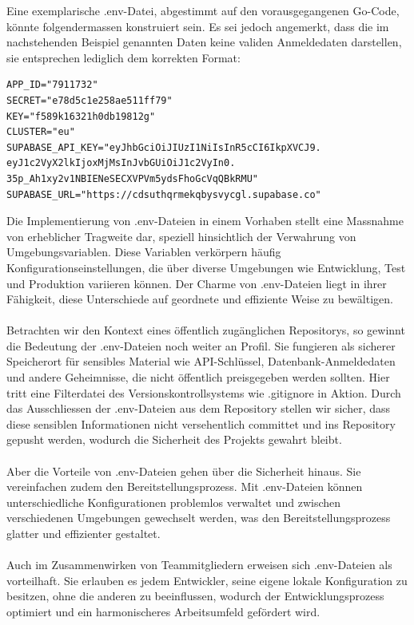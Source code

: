 Eine exemplarische .env-Datei, abgestimmt auf den vorausgegangenen Go-Code, könnte folgendermassen konstruiert sein. Es sei jedoch angemerkt, dass die im nachstehenden Beispiel genannten Daten keine validen Anmeldedaten darstellen, sie entsprechen lediglich dem korrekten Format:
\begin{lstlisting}
APP_ID="7911732"
SECRET="e78d5c1e258ae511ff79"
KEY="f589k16321h0db19812g"
CLUSTER="eu"
SUPABASE_API_KEY="eyJhbGciOiJIUzI1NiIsInR5cCI6IkpXVCJ9.
eyJ1c2VyX2lkIjoxMjMsInJvbGUiOiJ1c2VyIn0.
35p_Ah1xy2v1NBIENeSECXVPVm5ydsFhoGcVqQBkRMU"
SUPABASE_URL="https://cdsuthqrmekqbysvycgl.supabase.co"
\end{lstlisting}
Die Implementierung von .env-Dateien in einem Vorhaben stellt eine Massnahme von erheblicher Tragweite dar, speziell hinsichtlich der Verwahrung von Umgebungsvariablen. Diese Variablen verkörpern häufig Konfigurationseinstellungen, die über diverse Umgebungen wie Entwicklung, Test und Produktion variieren können. Der Charme von .env-Dateien liegt in ihrer Fähigkeit, diese Unterschiede auf geordnete und effiziente Weise zu bewältigen.\\\\
Betrachten wir den Kontext eines öffentlich zugänglichen Repositorys, so gewinnt die Bedeutung der .env-Dateien noch weiter an Profil. Sie fungieren als sicherer Speicherort für sensibles Material wie API-Schlüssel, Datenbank-Anmeldedaten und andere Geheimnisse, die nicht öffentlich preisgegeben werden sollten. Hier tritt eine Filterdatei des Versionskontrollsystems wie .gitignore in Aktion. Durch das Ausschliessen der .env-Dateien aus dem Repository stellen wir sicher, dass diese sensiblen Informationen nicht versehentlich committet und ins Repository gepusht werden, wodurch die Sicherheit des Projekts gewahrt bleibt.\\\\
Aber die Vorteile von .env-Dateien gehen über die Sicherheit hinaus. Sie vereinfachen zudem den Bereitstellungsprozess. Mit .env-Dateien können unterschiedliche Konfigurationen problemlos verwaltet und zwischen verschiedenen Umgebungen gewechselt werden, was den Bereitstellungsprozess glatter und effizienter gestaltet.\\\\
Auch im Zusammenwirken von Teammitgliedern erweisen sich .env-Dateien als vorteilhaft. Sie erlauben es jedem Entwickler, seine eigene lokale Konfiguration zu besitzen, ohne die anderen zu beeinflussen, wodurch der Entwicklungsprozess optimiert und ein harmonischeres Arbeitsumfeld gefördert wird.\\\\
